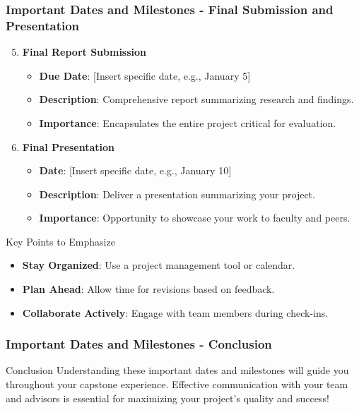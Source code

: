 \documentclass{beamer}
\begin{document}
\begin{frame}[fragile]
    \frametitle{Important Dates and Milestones - Final Submission and Presentation}
    \begin{enumerate}
        \setcounter{enumi}{4} %
        \item \textbf{Final Report Submission}
        \begin{itemize}
            \item \textbf{Due Date}: [Insert specific date, e.g., January 5]
            \item \textbf{Description}: Comprehensive report summarizing research and findings.
            \item \textbf{Importance}: Encapsulates the entire project critical for evaluation.
        \end{itemize}

        \item \textbf{Final Presentation}
        \begin{itemize}
            \item \textbf{Date}: [Insert specific date, e.g., January 10]
            \item \textbf{Description}: Deliver a presentation summarizing your project.
            \item \textbf{Importance}: Opportunity to showcase your work to faculty and peers.
        \end{itemize}

    \end{enumerate}    

    \begin{block}{Key Points to Emphasize}
        \begin{itemize}
            \item \textbf{Stay Organized}: Use a project management tool or calendar.
            \item \textbf{Plan Ahead}: Allow time for revisions based on feedback.
            \item \textbf{Collaborate Actively}: Engage with team members during check-ins.
        \end{itemize}
    \end{block}
    
\end{frame}

\begin{frame}[fragile]
    \frametitle{Important Dates and Milestones - Conclusion}
    \begin{block}{Conclusion}
        Understanding these important dates and milestones will guide you throughout your capstone experience. Effective communication with your team and advisors is essential for maximizing your project's quality and success!
    \end{block}
\end{frame}
\end{document}
